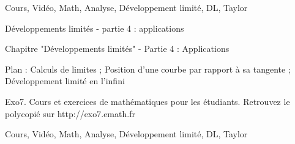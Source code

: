 
Cours, Vidéo, Math, Analyse, Développement limité, DL, Taylor






Développements limités - partie 4 : applications



Chapitre "Développements limités" - Partie 4 : Applications

Plan : Calculs de limites ; Position d'une courbe par rapport à sa tangente ;
Développement limité en l'infini

Exo7. Cours et exercices de mathématiques pour les étudiants.
Retrouvez le polycopié sur http://exo7.emath.fr


Cours, Vidéo, Math, Analyse, Développement limité, DL, Taylor




